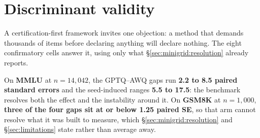 %
%
%
%

\section{Discriminant validity}
\label{sec:discriminant}

A certification-first framework invites one objection: a method that demands
thousands of items before declaring anything will declare nothing. The eight
confirmatory cells answer it, using only what
\S\ref{sec:minigrid:resolution} already reports.

On \textbf{MMLU} at $n = 14{,}042$, the GPTQ--AWQ gaps run \textbf{2.2 to 8.5
paired standard errors} and the seed-induced ranges \textbf{5.5 to 17.5}: the
benchmark resolves both the effect and the instability around it. On
\textbf{GSM8K} at $n = 1{,}000$, \textbf{three of the four gaps sit at or below
1.25 paired SE}, so that arm cannot resolve what it was built to measure, which
\S\ref{sec:minigrid:resolution} and \S\ref{sec:limitations} state rather than
average away.

